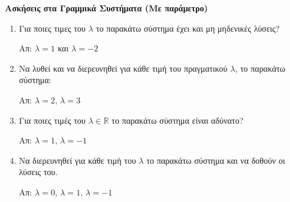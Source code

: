 \documentclass[a4paper,12pt]{article}
\begin{document}
\thispagestyle{empty}
\begin{center}
{\bfseries Ασκήσεις στα Γραμμικά Συστήματα (Με παράμετρο)}
\end{center}

\vspace{\baselineskip}


\begin{enumerate}
	\item Για ποιες τιμες του $\lambda$ το παρακάτω σύστημα έχει και μη μηδενικές λύσεις?

		 \hfill Απ: $ \lambda = 1 $ και $ \lambda = -2 $


	\item Να λυθεί και να διερευνηθεί για κάθε τιμή του πραγματικού $\lambda$, το παρακάτω σύστημα:

		 \hfill Απ: $ \lambda =2 $, $ \lambda =3 $



\item Για ποιες τιμές του $\lambda\in \mathbb{R}$ το παρακάτω σύστημα είναι αδύνατο?


	 \hfill Απ: $ \lambda = 1 $, $ \lambda = -1 $


\item Να διερευνηθεί για κάθε τιμή του $\lambda$ το παρακάτω σύστημα και να δοθούν οι λύσεις του.

	 \hfill Απ: $ \lambda =0 $, $ \lambda = 1 $, $ \lambda = -1 $
\end{enumerate}
\end{document}
